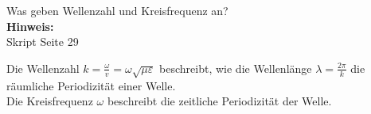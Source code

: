 \begin{question}[section=3,name={Wellenzahl 1},difficulty=,quantity=4,type=thr,tags={20130314,20060816}]
	Was geben Wellenzahl und Kreisfrequenz an?
	\\ \textbf{Hinweis:}\\
	Skript Seite 29
\end{question}
\begin{solution}
	Die Wellenzahl $k = \frac{\omega}{v} = \omega\sqrt{\mu\varepsilon}$ beschreibt, wie die Wellenlänge $\lambda = \frac{2\pi}{k}$ die räumliche Periodizität einer Welle.\\
	Die Kreisfrequenz $\omega$ beschreibt die zeitliche Periodizität der Welle.
\end{solution}
